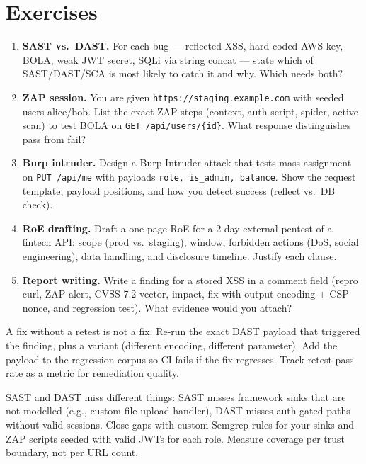 \section{Exercises}
\label{sec:ch07-exercises}
\begin{enumerate}[label=E7.\arabic*, leftmargin=*, itemsep=0.6em]
    \item \textbf{SAST vs.\ DAST.} For each bug --- reflected XSS, hard-coded AWS key, BOLA, weak JWT secret, SQLi via string concat --- state which of SAST/DAST/SCA is most likely to catch it and why. Which needs both?
    \item \textbf{ZAP session.} You are given \texttt{https://staging.example.com} with seeded users alice/bob. List the exact ZAP steps (context, auth script, spider, active scan) to test BOLA on \texttt{GET /api/users/\{id\}}. What response distinguishes pass from fail?
    \item \textbf{Burp intruder.} Design a Burp Intruder attack that tests mass assignment on \texttt{PUT /api/me} with payloads \texttt{role, is\_admin, balance}. Show the request template, payload positions, and how you detect success (reflect vs.\ DB check).
    \item \textbf{RoE drafting.} Draft a one-page RoE for a 2-day external pentest of a fintech API: scope (prod vs.\ staging), window, forbidden actions (DoS, social engineering), data handling, and disclosure timeline. Justify each clause.
    \item \textbf{Report writing.} Write a finding for a stored XSS in a comment field (repro curl, ZAP alert, CVSS 7.2 vector, impact, fix with output encoding + CSP nonce, and regression test). What evidence would you attach?
\end{enumerate}

\begin{remark}
A fix without a retest is not a fix. Re-run the exact DAST payload that triggered the finding, plus a variant (different encoding, different parameter). Add the payload to the regression corpus so CI fails if the fix regresses. Track retest pass rate as a metric for remediation quality.
\end{remark}

\begin{remark}
SAST and DAST miss different things: SAST misses framework sinks that are not modelled (e.g., custom file-upload handler), DAST misses auth-gated paths without valid sessions. Close gaps with custom Semgrep rules for your sinks and ZAP scripts seeded with valid JWTs for each role. Measure coverage per trust boundary, not per URL count.
\end{remark}

